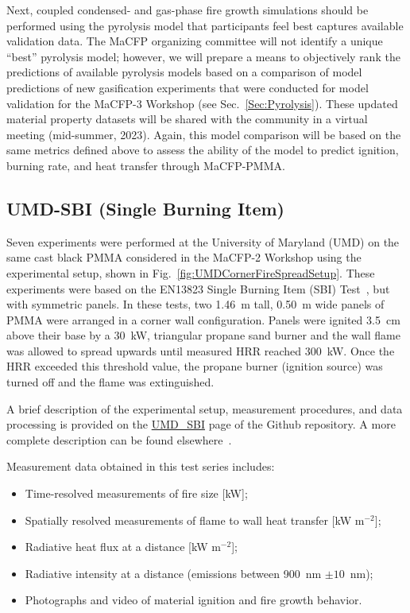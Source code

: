 \documentclass[12pt]{article}
\begin{document}
Next, coupled condensed- and gas-phase fire growth simulations should be performed using the pyrolysis model that participants feel best captures available validation data. The MaCFP organizing committee will not identify a unique ``best'' pyrolysis model; however, we will prepare a means to objectively rank the predictions of available pyrolysis models based on a comparison of model predictions of new gasification experiments that were conducted for model validation for the MaCFP-3 Workshop (see Sec.~\ref{Sec:Pyrolysis}). These updated material property datasets will be shared with the community in a virtual meeting (mid-summer, 2023). Again, this model comparison will be based on the same metrics defined above to assess the ability of the model to predict ignition, burning rate, and heat transfer through MaCFP-PMMA.

\subsection {UMD-SBI (Single Burning Item)}
Seven experiments were performed at the University of Maryland (UMD) on the same cast black PMMA considered in the MaCFP-2 Workshop using the experimental setup, shown in Fig.~\ref{fig:UMDCornerFireSpreadSetup}. These experiments were based on the EN13823 Single Burning Item (SBI) Test~\cite{EN-13823standard}, but with symmetric panels. In these tests, two 1.46~m tall, 0.50~m wide panels of PMMA were arranged in a corner wall configuration. Panels were ignited 3.5~cm above their base by a 30~kW, triangular propane sand burner and the wall flame was allowed to spread upwards until measured HRR reached 300~kW. Once the HRR exceeded this threshold value, the propane burner (ignition source) was turned off and the flame was extinguished.

A brief description of the experimental setup, measurement procedures, and data processing is provided on the \href{https://github.com/MaCFP/macfp-db/tree/master/Fire_Growth/UMD_SBI}{UMD\_SBI} page of the Github repository. A more complete description can be found elsewhere~\cite{chaudhari2021experimental}.

Measurement data obtained in this test series includes:
\begin{itemize}[noitemsep]
\item Time-resolved measurements of fire size [kW];
\item Spatially resolved measurements of flame to wall heat transfer [kW m$^{-2}$];
\item Radiative heat flux at a distance [kW m$^{-2}$];
\item Radiative intensity at a distance (emissions between 900~nm $\pm10$~nm);
\item Photographs and video of material ignition and fire growth behavior.
\end{itemize}
\end{document}
